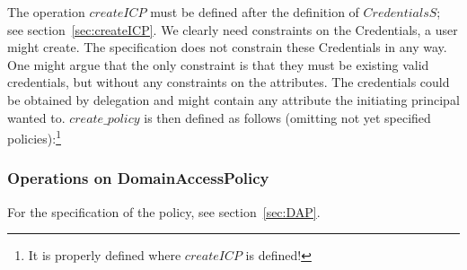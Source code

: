 The operation $createICP$ must be defined after the definition of
$CredentialsS$; see section~\ref{sec:createICP}.  
We clearly need constraints on the Credentials, a user might create.  The
\corbasec{} specification does not constrain these Credentials in any way.  One
might argue that the only constraint is that they must be existing valid
credentials, but without any constraints on the attributes.  The credentials
could be obtained by delegation and might contain any attribute the initiating
principal wanted to.  $create\_policy$ is then defined as follows (omitting not
yet specified policies):\footnote{It is properly defined where $createICP$ is
  defined!} 

\subsubsection{Operations on DomainAccessPolicy}
For the specification of the policy, see section~\ref{sec:DAP}.

